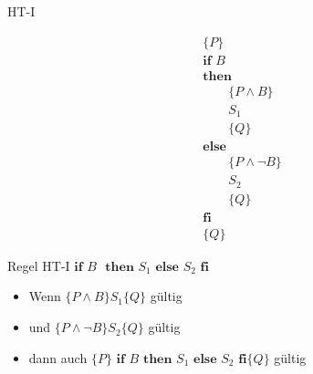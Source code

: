 \begin{frame}{HT-I}
	\begin{minipage}{0.4\linewidth}
		\begin{align*}
			&\{ P \} \\
			& \textbf{if } B \\
			& \textbf{then} \\
			&\hspace{2em} \{ P \wedge B \} \\
			&\hspace{2em} S_1 \\
			&\hspace{2em} \{ Q \}\\
			&\textbf{else} \\
			&\hspace{2em} \{ P \wedge \neg B \} \\
			&\hspace{2em} S_2 \\
			&\hspace{2em} \{ Q \}  \\
			&\textbf{fi}\\
			&\{Q \}
		\end{align*}
	\end{minipage}
	\begin{minipage}{0.55\linewidth}
		\begin{block}{Regel HT-I}
			$\textbf{if } B\text{ } \textbf{then } S_1 \textbf{ else } S_2 \textbf{ fi}$
			\vspace{1em}
			\begin{itemize}
				\item Wenn $\{ P \wedge B \} S_1 \{ Q \}$ gültig 
				\item und $\{ P \wedge \neg B \} S_2 \{ Q \}$ gültig
				\item dann auch $\{ P \} \textbf{ if } B \textbf{ then } S_1 \textbf{ else } S_2 \textbf{ fi} \{ Q \} $ gültig
			\end{itemize}
		\end{block}
	\end{minipage}
\end{frame}

